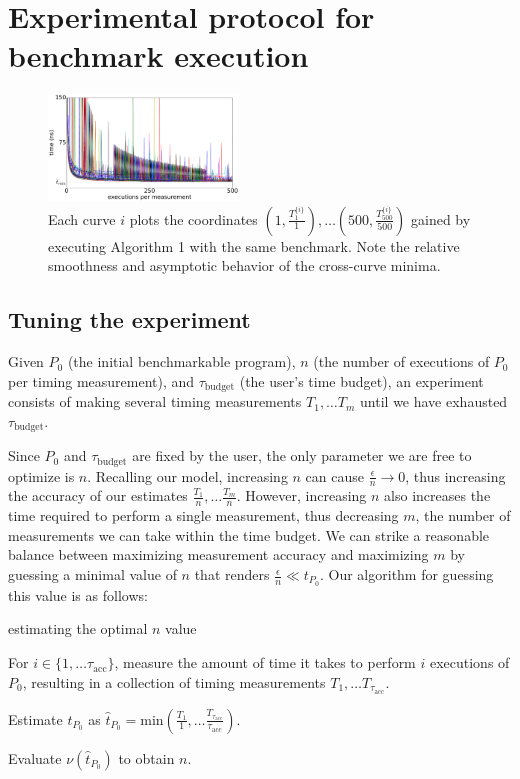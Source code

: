 \documentclass[conference]{IEEEtran}
\begin{document}
\label{sec:protocol}
\section{Experimental protocol for benchmark execution}

\begin{figure}
\centering
\includegraphics[width=0.45\textwidth]{figures/fig2/linear_scan_branchsum}
\caption{Each curve $i$ plots the coordinates $\left(1, \frac{T^{\{i\}}_1}{1}\right), \dots
\left(500, \frac{T^{\{i\}}_{500}}{500}\right)$ gained by executing Algorithm 1 with the same
benchmark. Note the relative smoothness and asymptotic behavior of the cross-curve minima.}
\label{fig:scaling}
\end{figure}

\subsection{Tuning the experiment}

Given $P_0$ (the initial benchmarkable program), $n$ (the number of executions of $P_0$ per
timing measurement), and $\tau_{\textrm{budget}}$ (the user's time budget), an experiment
consists of making several timing measurements $T_1, \dots T_m$ until we have exhausted
$\tau_{\textrm{budget}}$.

Since $P_0$ and $\tau_{\textrm{budget}}$ are fixed by the user, the only parameter we are
free to optimize is $n$. Recalling our model, increasing $n$ can cause $\frac{\epsilon}{n}
\to 0$, thus increasing the accuracy of our estimates $\frac{T_1}{n}, \dots \frac{T_m}{n}$.
However, increasing $n$ also increases the time required to perform a single measurement,
thus decreasing $m$, the number of measurements we can take within the time budget. We can
strike a reasonable balance between maximizing measurement accuracy and maximizing $m$ by
guessing a minimal value of $n$ that renders $\frac{\epsilon}{n} \ll t_{P_0}$. Our
algorithm for guessing this value is as follows:

\begin{algorithm}
    \caption{estimating the optimal $n$ value}
    For $i \in \{1, \dots \tau_{\textrm{acc}}\}$, measure the amount of time it takes
    to perform $i$ executions of $P_0$, resulting in a collection of timing measurements
    $T_1, \dots T_{\tau_{\textrm{acc}}}$.

    Estimate $t_{P_0}$ as $\hat{t}_{P_0} = \textrm{min}(\frac{T_1}{1}, \dots \frac{T_{\tau_{\textrm{acc}}}}{\tau_{\textrm{acc}}})$.

    Evaluate $\nu(\hat{t}_{P_0})$ to obtain $n$.
\end{algorithm}
\end{document}
